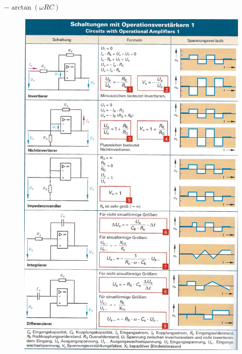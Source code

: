\documentclass[a5paper, 12pt, twoside]{scrartcl}
\begin{document}
\vspace{1cm}

\dotfill\(-\arctan(\omega RC)\)

\newpage

\begin{figure}[H]
  \centering
  \includegraphics[width=.93\textwidth]{OPV1}
\end{figure}
\end{document}
